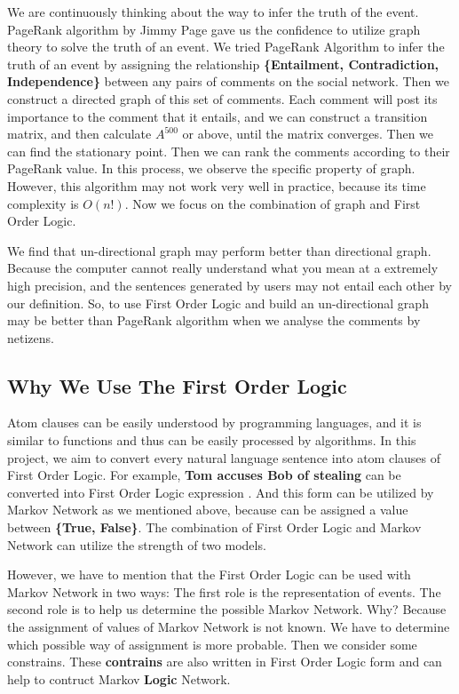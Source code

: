 \documentclass[
12pt, %
a4paper, %
oneside, %
headinclude,footinclude, %
BCOR5mm, %
]{scrartcl}
\begin{document}
We are continuously thinking about the way to infer the truth of the event. PageRank algorithm by Jimmy Page gave us the
confidence to utilize graph theory to solve the truth of an event. We tried PageRank Algorithm to infer the truth of an
event by assigning the relationship \textbf{\{Entailment, Contradiction, Independence\}} between any pairs of comments on
the social network. Then we construct a directed graph of this set of comments. Each comment will post its importance to
the comment that it entails, and we can construct a transition matrix, and then calculate $A^{500}$ or above, until the matrix
converges. Then we can find the stationary point. Then we can rank the comments according to their PageRank value. In this process,
we observe the specific property of graph. However, this algorithm may not work very well in practice, because its time complexity is $O(n!)$. 
Now we focus on the combination of graph and First Order Logic. 

We find that un-directional graph may perform better than directional graph. Because the computer cannot really understand what you mean at a extremely high
precision, and the sentences generated by users may not entail each other by our definition. So, to use First Order Logic and build an un-directional graph may be better than PageRank algorithm when we analyse the comments by netizens.

\subsection{Why We Use The First Order Logic}
Atom clauses can be easily understood by programming languages, and it is similar to functions and thus can be easily processed by algorithms. In this project, we aim to convert every natural language sentence into atom clauses of First Order Logic. For example, \textbf{Tom accuses Bob of stealing} can be converted into First Order Logic expression \textbf{}. And this form can be utilized by Markov Network as we mentioned above, because \textbf{} can be assigned a value between \textbf{\{True, False\}}. The combination of First Order Logic and Markov Network can utilize the strength of two models.

However, we have to mention that the First Order Logic can be used with Markov Network in two ways: The first role is the representation of events. The second role is to help us determine the possible Markov Network. Why? Because the assignment of values of Markov Network is not known. We have to determine which possible way of assignment is more probable. Then we consider some constrains. These \textbf{contrains} are also written in First Order Logic form and can help to contruct Markov \textbf{Logic} Network. 
\end{document}
